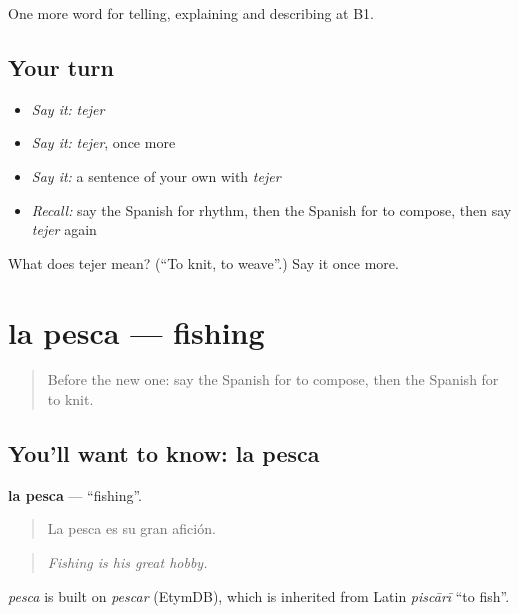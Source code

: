 \begin{grammarlens}[title={What you've built}]
One more word for telling, explaining and describing at B1.
\end{grammarlens}

\subsection*{Your turn}
\begin{itemize}
\raggedright
  \item \emph{Say it:} \emph{tejer}
  \item \emph{Say it:} \emph{tejer}, once more
  \item \emph{Say it:} a sentence of your own with \emph{tejer}
  \item \emph{Recall:} say the Spanish for rhythm, then the Spanish for to compose, then say \emph{tejer} again
\end{itemize}

\begin{tcolorbox}[breakable,colback=teal!4,colframe=teal!35!black,title={Before you move on}]
What does tejer mean? (\textquotedblleft{}To knit, to weave\textquotedblright{}.) Say it once more.
\end{tcolorbox}
\section[la pesca]{la pesca — fishing}

\label{lesson:ES-C754-pesca}



\begin{quote}
Before the new one: say the Spanish for to compose, then the Spanish for to knit.
\end{quote}

\subsection*{You'll want to know: la pesca}
\textbf{la pesca} — \textquotedblleft{}fishing\textquotedblright{}.

\begin{quote}
La pesca es su gran afición.
\end{quote}

\begin{quote}
\emph{Fishing is his great hobby.}
\end{quote}

\begin{cousinweb}
\emph{pesca} is built on \emph{pescar} (EtymDB), which is inherited from Latin \emph{piscārī} \textquotedblleft{}to fish\textquotedblright{}.
\end{cousinweb}

